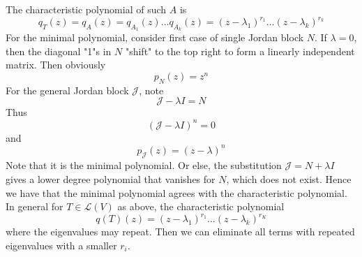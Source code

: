 \documentclass[12pt]{article}
\begin{document}
	The characteristic polynomial of such $A$ is
	$$q_T(z) = q_A(z) = q_{A_1}(z)\dots q_{A_k}(z) = (z-\lambda_1)^{r_1}\dots(z-\lambda_k)^{r_k}$$
	For the minimal polynomial, consider first case of single Jordan block $N$. If $\lambda=0$, then the diagonal "1"s in $N$ "shift" to the top right to form a linearly independent matrix. Then obviously
	$$p_N(z) = z^n$$
	For the general Jordan block $\mathcal{J}$, note
	$$\mathcal J-\lambda I = N$$
	Thus
	$$(\mathcal{J}-\lambda I)^n = 0$$
	and
	$$p_{\mathcal J}(z) = (z-\lambda)^n$$
	Note that it is the minimal polynomial. Or else, the substitution $\mathcal J = N + \lambda I$ gives a lower degree polynomial that vanishes for $N$, which does not exist. Hence we have that the minimal polynomial agrees with the characteristic polynomial. \\
	In general for $T\in\mathcal L(V)$ as above, the characteristic polynomial
$$q(T)(z) = (z-\lambda_1)^{r_1}\dots(z-\lambda_k)^{r_K}$$
where the eigenvalues may repeat. Then we can eliminate all terms with repeated eigenvalues with a smaller $r_i$.
\end{document}
